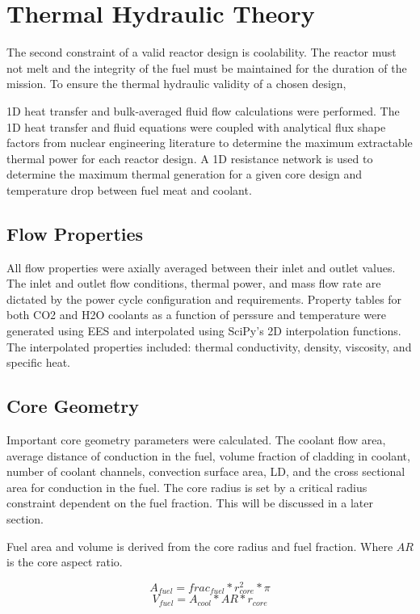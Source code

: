 \section{Thermal Hydraulic Theory}

    The second constraint of a valid reactor design is coolability. The reactor must
not melt and the integrity of the fuel must be maintained for the duration of
the mission. To ensure the thermal hydraulic validity of a chosen design, 

    1D heat transfer and bulk-averaged fluid flow calculations were performed. The 1D
heat transfer and fluid equations were coupled with analytical flux shape
factors from nuclear engineering literature to determine the maximum extractable
thermal power for each reactor design. A 1D resistance network is used to
determine the maximum thermal generation for a given core design and temperature
drop between fuel meat and coolant.

\subsection{Flow Properties}
All flow properties were axially averaged between their inlet and outlet values.
The inlet and outlet flow conditions, thermal power, and mass flow rate are
dictated by the power cycle configuration and requirements. Property tables for
both CO2 and H2O coolants as a function of perssure and temperature were 
generated using EES and interpolated using SciPy's 2D interpolation functions.
The interpolated properties included: thermal conductivity, density, viscosity,
and specific heat.

\subsection{Core Geometry}

Important core geometry parameters were calculated. The coolant flow area,
average distance of conduction in the fuel, volume fraction of cladding in
coolant, number of coolant channels, convection surface area, LD, and the cross
sectional area for conduction in the fuel. The core radius is set by a critical
radius constraint dependent on the fuel fraction. This will be discussed in a
later section.

Fuel area and volume is derived from the core radius and fuel fraction. Where
$AR$ is the core aspect ratio.

\begin{equation}
    A_{fuel} = frac_{fuel}*r_{core}^2*\pi
\end{equation}
\begin{equation}
    V_{fuel} = A_{cool}*AR*r_{core}
\end{equation}

